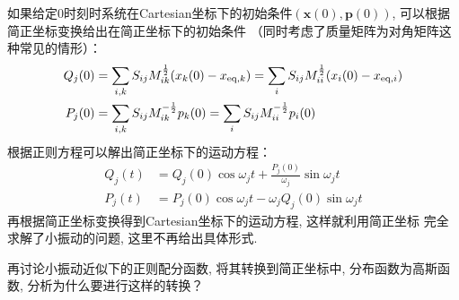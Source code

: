     \splitline

    如果给定0时刻时系统在Cartesian坐标下的初始条件$(\bm{x}(0),\bm{p}(0))$, 
    可以根据简正坐标变换给出在简正坐标下的初始条件
    （同时考虑了质量矩阵为对角矩阵这种常见的情形）：
    \begin{equation}
        \begin{aligned}
            Q_j(0) &=\sum_{i,k} S_{ij} M^{\frac{1}{2}}_{ik}(x_k(0) - x_{\mathrm{eq},k}) =\sum_i S_{ij} M_{ii}^{\frac 12} (x_i(0) - x_{\mathrm{eq},i})\\
            P_j(0) &=\sum_{i,k} S_{ij} M^{-\frac{1}{2}}_{ik}p_k(0)=\sum_i S_{ij} M_{ii}^{-\frac 12} p_{i}(0)
        \end{aligned}
    \end{equation}
    根据正则方程可以解出简正坐标下的运动方程：
    \begin{equation}
        \begin{aligned}
            Q_j(t) &= Q_j(0)\cos{\omega_j t} + \frac{P_j(0)}{\omega_j} \sin{\omega_j t}\\
            P_j(t) &= P_j(0)\cos{\omega_j t} - \omega_j Q_j(0) \sin{\omega_j t}
        \end{aligned}
    \end{equation}
    再根据简正坐标变换得到Cartesian坐标下的运动方程, 这样就利用简正坐标
    完全求解了小振动的问题, 这里不再给出具体形式.

    \splitline

    再讨论小振动近似下的正则配分函数, 
    将其转换到简正坐标中, 分布函数为高斯函数, 分析为什么要进行这样的转换？

